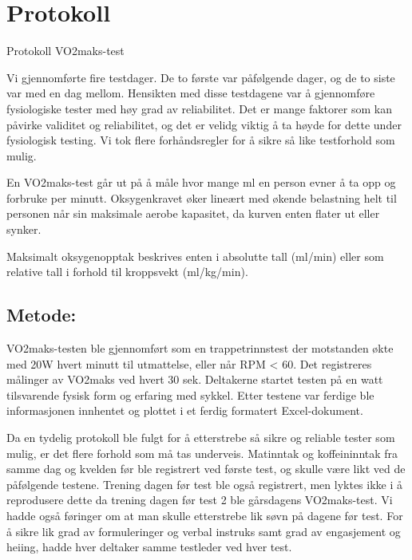 \documentclass[
  letterpaper,
  DIV=11,
  numbers=noendperiod]{scrreprt}
\begin{document}

\chapter{Protokoll}\label{protokoll}

Protokoll VO2maks-test

Vi gjennomførte fire testdager. De to første var påfølgende dager, og de
to siste var med en dag mellom. Hensikten med disse testdagene var å
gjennomføre fysiologiske tester med høy grad av reliabilitet. Det er
mange faktorer som kan påvirke validitet og reliabilitet, og det er
velidg viktig å ta høyde for dette under fysiologisk testing. Vi tok
flere forhåndsregler for å sikre så like testforhold som mulig.

En VO2maks-test går ut på å måle hvor mange ml en person evner å ta opp
og forbruke per minutt. Oksygenkravet øker lineært med økende belastning
helt til personen når sin maksimale aerobe kapasitet, da kurven enten
flater ut eller synker.

Maksimalt oksygenopptak beskrives enten i absolutte tall (ml/min) eller
som relative tall i forhold til kroppsvekt (ml/kg/min).

\section{Metode:}\label{metode}

VO2maks-testen ble gjennomført som en trappetrinnstest der motstanden
økte med 20W hvert minutt til utmattelse, eller når RPM \textless{} 60.
Det registreres målinger av VO2maks ved hvert 30 sek. Deltakerne startet
testen på en watt tilsvarende fysisk form og erfaring med sykkel. Etter
testene var ferdige ble informasjonen innhentet og plottet i et ferdig
formatert Excel-dokument.

Da en tydelig protokoll ble fulgt for å etterstrebe så sikre og reliable
tester som mulig, er det flere forhold som må tas underveis. Matinntak
og koffeininntak fra samme dag og kvelden før ble registrert ved første
test, og skulle være likt ved de påfølgende testene. Trening dagen før
test ble også registrert, men lyktes ikke i å reprodusere dette da
trening dagen før test 2 ble gårsdagens VO2maks-test. Vi hadde også
føringer om at man skulle etterstrebe lik søvn på dagene før test. For å
sikre lik grad av formuleringer og verbal instruks samt grad av
engasjement og heiing, hadde hver deltaker samme testleder ved hver
test.
\end{document}
